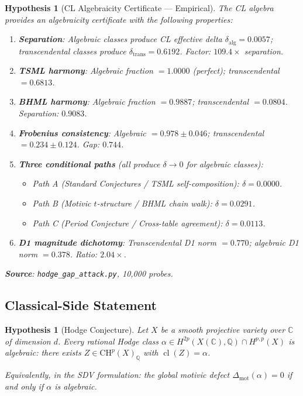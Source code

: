 \documentclass[11pt]{article}
\newtheorem{hypothesis}[lemma]{Hypothesis}
\theoremstyle{definition}
\DeclareMathOperator{\cl}{cl}
\begin{document}
\begin{hypothesis}[CL Algebraicity Certificate --- Empirical]
\label{hyp:cl-algebraicity-hodge}
The CL algebra provides an algebraicity certificate with the following properties:
\begin{enumerate}
  \item[(A1)] \textbf{Separation}: Algebraic classes produce CL effective delta
    $\delta_{\mathrm{alg}} = 0.0057$; transcendental classes produce
    $\delta_{\mathrm{trans}} = 0.6192$.  Factor: $109.4\times$ separation.
  \item[(A2)] \textbf{TSML harmony}: Algebraic fraction $= 1.0000$ (perfect);
    transcendental $= 0.6813$.
  \item[(A3)] \textbf{BHML harmony}: Algebraic fraction $= 0.9887$;
    transcendental $= 0.0804$.  Separation: $0.9083$.
  \item[(A4)] \textbf{Frobenius consistency}: Algebraic $= 0.978 \pm 0.046$;
    transcendental $= 0.234 \pm 0.124$.  Gap: $0.744$.
  \item[(A5)] \textbf{Three conditional paths} (all produce $\delta \to 0$
    for algebraic classes):
    \begin{itemize}
      \item Path A (Standard Conjectures / TSML self-composition): $\delta = 0.0000$.
      \item Path B (Motivic $t$-structure / BHML chain walk): $\delta = 0.0291$.
      \item Path C (Period Conjecture / Cross-table agreement): $\delta = 0.0113$.
    \end{itemize}
  \item[(A6)] \textbf{D1 magnitude dichotomy}: Transcendental D1 norm $= 0.770$;
    algebraic D1 norm $= 0.378$.  Ratio: $2.04\times$.
\end{enumerate}
\textbf{Source}: \texttt{hodge\_gap\_attack.py}, 10,000 probes.
\end{hypothesis}

\subsection{Classical-Side Statement}

\begin{hypothesis}[Hodge Conjecture]
\label{hyp:hodge-classical}
Let $X$ be a smooth projective variety over $\mathbb{C}$ of dimension $d$.
Every rational Hodge class $\alpha \in H^{2p}(X(\mathbb{C}), \mathbb{Q}) \cap H^{p,p}(X)$
is algebraic: there exists $Z \in \mathrm{CH}^p(X)_{\mathbb{Q}}$ with $\cl(Z) = \alpha$.

Equivalently, in the SDV formulation: the global motivic defect
$\Delta_{\mathrm{mot}}(\alpha) = 0$ if and only if $\alpha$ is algebraic.
\end{hypothesis}
\end{document}
